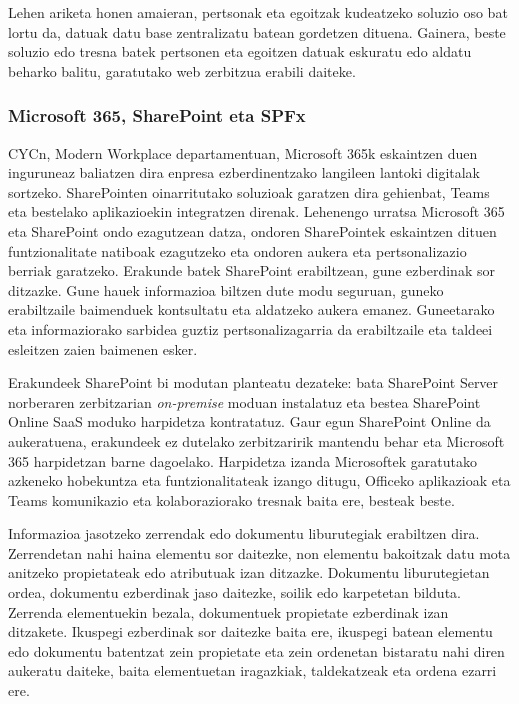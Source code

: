 Lehen ariketa honen amaieran, pertsonak eta egoitzak kudeatzeko soluzio oso bat lortu da, datuak datu base
zentralizatu batean gordetzen dituena. Gainera, beste soluzio edo tresna batek pertsonen eta egoitzen
datuak eskuratu edo aldatu beharko balitu, garatutako web zerbitzua erabili daiteke.

\subsubsection{Microsoft 365, SharePoint eta SPFx}

CYCn, Modern Workplace departamentuan, Microsoft 365k eskaintzen duen inguruneaz baliatzen dira enpresa
ezberdinentzako langileen lantoki digitalak sortzeko. SharePointen oinarritutako soluzioak garatzen dira
gehienbat, Teams eta bestelako aplikazioekin integratzen direnak. Lehenengo urratsa Microsoft 365 eta
SharePoint ondo ezagutzean datza, ondoren SharePointek eskaintzen dituen funtzionalitate natiboak ezagutzeko
eta ondoren aukera eta pertsonalizazio berriak garatzeko. Erakunde batek SharePoint erabiltzean, gune ezberdinak
sor ditzazke. Gune hauek informazioa biltzen dute modu seguruan, guneko erabiltzaile baimenduek kontsultatu eta
aldatzeko aukera emanez. Guneetarako eta informaziorako sarbidea guztiz pertsonalizagarria da erabiltzaile eta taldeei
esleitzen zaien baimenen esker.

Erakundeek SharePoint bi modutan planteatu dezateke: bata SharePoint Server norberaren zerbitzarian \textit{on-premise}
moduan instalatuz eta bestea SharePoint Online SaaS moduko harpidetza kontratatuz. Gaur egun SharePoint Online
da aukeratuena, erakundeek ez dutelako zerbitzaririk mantendu behar eta Microsoft 365 harpidetzan barne dagoelako.
Harpidetza izanda Microsoftek garatutako azkeneko hobekuntza eta funtzionalitateak izango ditugu, Officeko
aplikazioak eta Teams komunikazio eta kolaboraziorako tresnak baita ere, besteak beste. 

Informazioa jasotzeko zerrendak edo dokumentu liburutegiak erabiltzen dira. Zerrendetan nahi haina
elementu sor daitezke, non elementu bakoitzak datu mota anitzeko propietateak edo atributuak izan ditzazke.
Dokumentu liburutegietan ordea, dokumentu ezberdinak jaso daitezke, soilik edo karpetetan bilduta. Zerrenda
elementuekin bezala, dokumentuek propietate ezberdinak izan ditzakete. Ikuspegi ezberdinak sor daitezke baita
ere, ikuspegi batean elementu edo dokumentu batentzat zein propietate eta zein ordenetan bistaratu nahi
diren aukeratu daiteke, baita elementuetan iragazkiak, taldekatzeak eta ordena ezarri ere.

